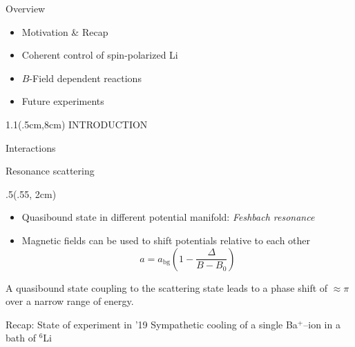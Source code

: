 \begin{frame}[t]{Overview}
   \begin{itemize}
       \setlength\itemsep{1.3cm}
       \item Motivation \& Recap
        \item Coherent control of spin-polarized Li
       \item $B$-Field dependent reactions 
        \item Future experiments

   \end{itemize} 
\end{frame}

\begin{frame}[plain, t]
    \begin{textblock*}{1.1\linewidth}(.5cm,8cm)
        {\huge \color{white} \textsc{INTRODUCTION}}
    \end{textblock*}
\end{frame}

\begin{frame}[t]{Interactions}
\end{frame}

\begin{frame}[t]{Resonance scattering}
    \begin{textblock*}{.5\linewidth}(.55\linewidth, 2cm)
       \small
       \begin{itemize}
           \item Quasibound state in different potential manifold: \emph{Feshbach resonance}
           \item Magnetic fields can be used to shift potentials relative to each other
               \[ a = a_\text{bg} \left( 1 - \frac{\Delta}{B-B_0} \right) \]
       \end{itemize}
    \end{textblock*}
   A quasibound state coupling to the scattering state leads to a phase shift of $\approx \pi$ over a narrow range
   of energy. 
\end{frame}

\begin{frame}[t]{Recap: State of experiment in '19}
Sympathetic cooling of a single Ba$^+$--ion in a bath of $^6$Li
\end{frame}

